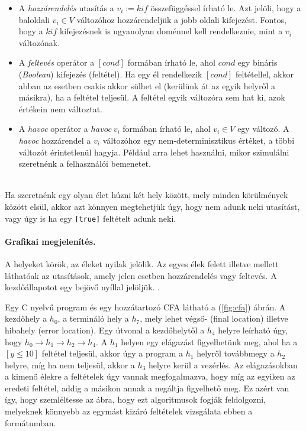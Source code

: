 \begin{itemize}
	\item A \emph{hozzárendelés} utasítás a $v_i := \mathit{kif}$ összefüggéssel írható le. Azt jelöli, hogy a baloldali $v_i \in V$ változóhoz hozzárendeljük a jobb oldali kifejezést. Fontos, hogy a $\mathit{kif}$ kifejezésnek is ugyanolyan doménnel kell rendelkeznie, mint a $v_i$ változónak.
	
	\item A \emph{feltevés} operátor a $[\mathit{cond}]$ formában írható le, ahol $\mathit{cond}$ egy bináris (\emph{Boolean}) kifejezés (feltétel). Ha egy él rendelkezik $\mathit{[cond]}$ feltétellel, akkor abban az esetben csakis akkor sülhet el (kerülünk át az egyik helyről a másikra), ha a feltétel teljesül. A feltétel egyik változóra sem hat ki, azok értékein nem változtat.
	
	\item A \emph{havoc} operátor a $\mathit{havoc}~v_i$ formában írható le, ahol $v_i \in V$ egy változó. A \emph{havoc} hozzárendel a $v_i$ változóhoz egy nem-determinisztikus értéket, a többi változót érintetlenül hagyja. Például arra lehet használni, mikor szimulálni szeretnénk a felhasználói bemenetet.
\end{itemize}
\ \\
Ha szeretnénk egy olyan élet húzni két hely között, mely minden körülmények között elsül, akkor azt könnyen megtehetjük úgy, hogy nem adunk neki utasítást, vagy úgy is ha egy \texttt{[true]} feltételt adunk neki.

\paragraph{Grafikai megjelenítés.}
A helyeket körök, az éleket nyilak jelölik. Az egyes élek felett illetve mellett láthatóak az utasítások, amely jelen esetben hozzárendelés vagy feltevés. A kezdőállapotot egy bejövő nyíllal jelöljük. \cite{soft_ver_akos}.

\begin{example}
	Egy C nyelvű program és egy hozzátartozó CFA látható a (\ref{fig:cfa}) ábrán. A kezdőhely a $h_0$, a termináló hely a $h_7$, mely lehet végső- (final location) illetve hibahely (error location). Egy útvonal a kezdőhelytől a $h_4$ helyre leírható úgy, hogy $h_0 \rightarrow h_1 \rightarrow h_2 \rightarrow h_4$. A $h_1$ helyen egy elágazást figyelhetünk meg, ahol ha a $[y \leq 10]$ feltétel teljesül, akkor úgy a program a $h_1$ helyről továbbmegy a $h_2$ helyre, míg ha nem teljesül, akkor a $h_3$ helyre kerül a vezérlés. Az elágazásokban a kimenő élekre a feltételek úgy vannak megfogalmazva, hogy míg az egyiken az eredeti feltétel, addig a másikon annak a negáltja figyelhető meg. Ez azért van így, hogy szemléltesse az ábra, hogy ezt algoritmusok fogják feldolgozni, melyeknek könnyebb az egymást kizáró feltételek vizsgálata ebben a formátumban.
\end{example}

